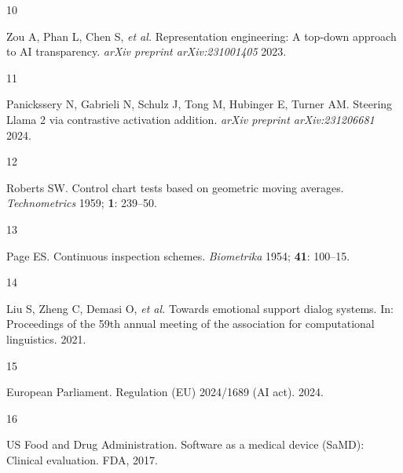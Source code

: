 \documentclass[
  10pt,
  a4paper,
  onecolumn]{article}
\newlength{\cslhangindent}
\newlength{\csllabelwidth}
\newenvironment{CSLReferences}[2] %
 {\begin{list}{}{%
  \setlength{\itemindent}{0pt}
  \setlength{\leftmargin}{0pt}
  \setlength{\parsep}{0pt}
  \ifodd #1
   \setlength{\leftmargin}{\cslhangindent}
   \setlength{\itemindent}{-1\cslhangindent}
  \fi
  \setlength{\itemsep}{#2\baselineskip}}}
 {\end{list}}
\newcommand{\CSLLeftMargin}[1]{\parbox[t]{\csllabelwidth}{\strut#1\strut}}
\newcommand{\CSLRightInline}[1]{\parbox[t]{\linewidth - \csllabelwidth}{\strut#1\strut}}
\begin{document}
\begin{CSLReferences}{0}{1}
\CSLLeftMargin{10 }%
\CSLRightInline{Zou A, Phan L, Chen S, \emph{et al.} Representation
engineering: A top-down approach to {AI} transparency. \emph{arXiv
preprint arXiv:231001405} 2023.}

\CSLLeftMargin{11 }%
\CSLRightInline{Panickssery N, Gabrieli N, Schulz J, Tong M, Hubinger E,
Turner AM. Steering {Llama} 2 via contrastive activation addition.
\emph{arXiv preprint arXiv:231206681} 2024.}

\CSLLeftMargin{12 }%
\CSLRightInline{Roberts SW. Control chart tests based on geometric
moving averages. \emph{Technometrics} 1959; \textbf{1}: 239--50.}

\CSLLeftMargin{13 }%
\CSLRightInline{Page ES. Continuous inspection schemes.
\emph{Biometrika} 1954; \textbf{41}: 100--15.}

\CSLLeftMargin{14 }%
\CSLRightInline{Liu S, Zheng C, Demasi O, \emph{et al.} Towards
emotional support dialog systems. In: Proceedings of the 59th annual
meeting of the association for computational linguistics. 2021.}

\CSLLeftMargin{15 }%
\CSLRightInline{European Parliament. Regulation ({EU}) 2024/1689 ({AI}
act). 2024.}

\CSLLeftMargin{16 }%
\CSLRightInline{US Food and Drug Administration. Software as a medical
device ({SaMD}): Clinical evaluation. FDA, 2017.}

\end{CSLReferences}
\end{document}
